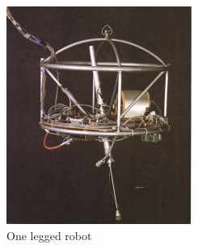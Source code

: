 \documentclass[USenglish]{ifimaster}  %
\begin{document}
	\begin{figure}
		\centering
		\begin{subfigure}[b]{0.22\textwidth}
			\centering
			\includegraphics[width=\linewidth]{Figures/Hopper}
			\caption{One legged robot \cite{Raibert:1986:LR:5948.5950}}
			\label{fig:onlegg}
		\end{subfigure}\hfill
		\begin{subfigure}[b]{0.22\textwidth}
			\centering

\end{subfigure}
\end{figure}
\end{document}
